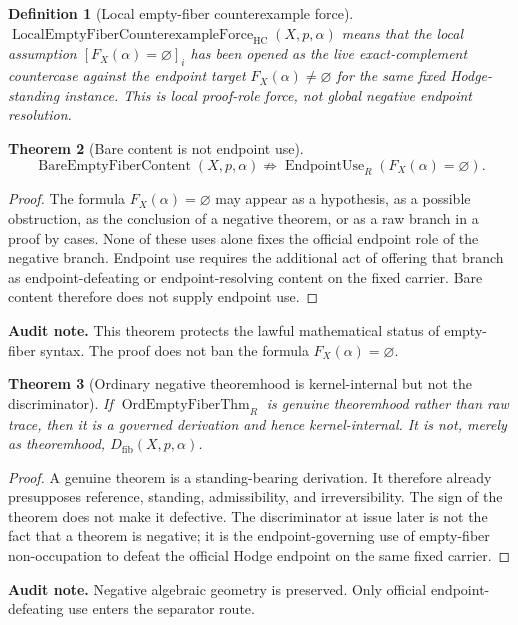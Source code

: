 \documentclass[11pt]{article}
\newtheorem{theorem}{Theorem}[section]
\newtheorem{definition}[theorem]{Definition}
\newcommand{\HC}{\operatorname{HC}}
\newcommand{\EndpointUse}{\operatorname{EndpointUse}}
\begin{document}
\begin{definition}[Local empty-fiber counterexample force]
$\operatorname{LocalEmptyFiberCounterexampleForce}_{\HC}(X,p,\alpha)$ means that the local assumption $[F_X(\alpha)=\varnothing]_i$ has been opened as the live exact-complement countercase against the endpoint target $F_X(\alpha)\neq\varnothing$ for the same fixed Hodge-standing instance.  This is local proof-role force, not global negative endpoint resolution.
\end{definition}

\begin{theorem}[Bare content is not endpoint use]
\[
\operatorname{BareEmptyFiberContent}(X,p,\alpha)\not\Rightarrow \EndpointUse_R(F_X(\alpha)=\varnothing).
\]
\end{theorem}
\begin{proof}
The formula $F_X(\alpha)=\varnothing$ may appear as a hypothesis, as a possible obstruction, as the conclusion of a negative theorem, or as a raw branch in a proof by cases.  None of these uses alone fixes the official endpoint role of the negative branch.  Endpoint use requires the additional act of offering that branch as endpoint-defeating or endpoint-resolving content on the fixed carrier.  Bare content therefore does not supply endpoint use.
\end{proof}
\par\noindent\textbf{Audit note.} This theorem protects the lawful mathematical status of empty-fiber syntax.  The proof does not ban the formula $F_X(\alpha)=\varnothing$.

\begin{theorem}[Ordinary negative theoremhood is kernel-internal but not the discriminator]
If $\operatorname{OrdEmptyFiberThm}_R$ is genuine theoremhood rather than raw trace, then it is a governed derivation and hence kernel-internal.  It is not, merely as theoremhood, $D_{\mathrm{fib}}(X,p,\alpha)$.
\end{theorem}
\begin{proof}
A genuine theorem is a standing-bearing derivation.  It therefore already presupposes reference, standing, admissibility, and irreversibility.  The sign of the theorem does not make it defective.  The discriminator at issue later is not the fact that a theorem is negative; it is the endpoint-governing use of empty-fiber non-occupation to defeat the official Hodge endpoint on the same fixed carrier.
\end{proof}
\par\noindent\textbf{Audit note.} Negative algebraic geometry is preserved.  Only official endpoint-defeating use enters the separator route.
\end{document}
